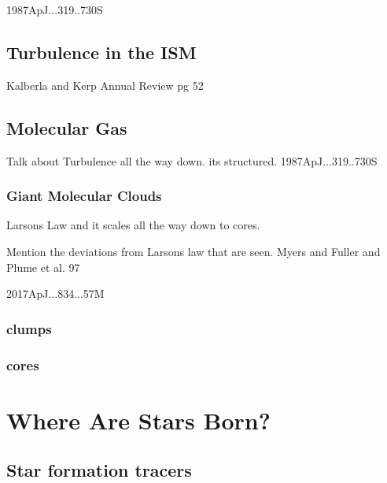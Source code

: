\documentclass[../dissertation.tex]{subfiles}
\begin{document}
1987ApJ...319..730S

\subsection{Turbulence in the ISM}
Kalberla and Kerp Annual Review pg 52

\subsection{Molecular Gas}



Talk about Turbulence all the way down. its structured.
1987ApJ...319..730S


\subsubsection{Giant Molecular Clouds}
Larsons Law and it scales all the way down to cores.

Mention the deviations from Larsons law that are seen. Myers and Fuller and Plume et al. 97

2017ApJ...834...57M
\subsubsection{clumps}

\subsubsection{cores}










\section{Where Are Stars Born?}

\subsection{Star formation tracers}
\end{document}
